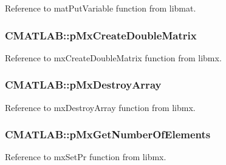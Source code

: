 Reference to mat\-Put\-Variable function from libmat. 

\hypertarget{class_c_m_a_t_l_a_b_a39b2341b32007df69682062513aeb208}{
\subsubsection[{p\-Mx\-Create\-Double\-Matrix}]{ C\-M\-A\-T\-L\-A\-B\-::p\-Mx\-Create\-Double\-Matrix\hspace{0.3cm}{\ttfamily [private]}}}\label{class_c_m_a_t_l_a_b_a39b2341b32007df69682062513aeb208}


Reference to mx\-Create\-Double\-Matrix function from libmx. 

\hypertarget{class_c_m_a_t_l_a_b_ac882abd9bca8e3568632f97f54ac419e}{
\subsubsection[{p\-Mx\-Destroy\-Array}]{ C\-M\-A\-T\-L\-A\-B\-::p\-Mx\-Destroy\-Array\hspace{0.3cm}{\ttfamily [private]}}}\label{class_c_m_a_t_l_a_b_ac882abd9bca8e3568632f97f54ac419e}


Reference to mx\-Destroy\-Array function from libmx. 

\hypertarget{class_c_m_a_t_l_a_b_ad4e70fa3e8a70bd9ca7bcf6c52b6e9c1}{
\subsubsection[{p\-Mx\-Get\-Number\-Of\-Elements}]{ C\-M\-A\-T\-L\-A\-B\-::p\-Mx\-Get\-Number\-Of\-Elements\hspace{0.3cm}{\ttfamily [private]}}}\label{class_c_m_a_t_l_a_b_ad4e70fa3e8a70bd9ca7bcf6c52b6e9c1}


Reference to mx\-Set\-Pr function from libmx. 

